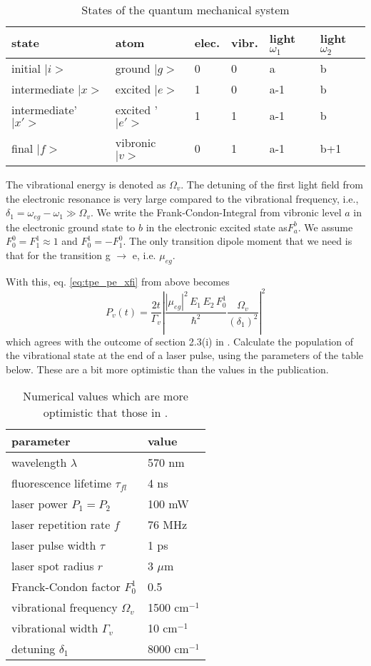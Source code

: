 \begin{table}

\begin{tabular}{l|lll|ll}
state & atom & elec. & vibr. & light $\omega_1$ & light
$\omega_2$ \\ \hline%
initial $|i>$ & ground  $|g>$ & 0  & 0 & a  & b  \\%
intermediate $|x>$ & excited  $|e>$& 1 & 0  & a-1 & b \\%
intermediate' $|x'>$ & excited '  $|e'>$& 1 & 1& a-1  & b \\ %
final $|f>$ & vibronic  $|v>$ & 0 &1& a-1 &b+1
\end{tabular}
\caption{States of the quantum mechanical system}
\end{table}

The vibrational energy is denoted as $ \Omega_v$. The detuning of the first light field from the electronic resonance is very large compared to the vibrational frequency, i.e.,  $\delta_1 = \omega_{eg} - \omega_1  \gg
\Omega_v$. We write the Frank-Condon-Integral
from vibronic level $a$ in the electronic ground state to $b$ in the
electronic excited state as$F_a^b$. We assume  $F_0^0 = F_1^1 \approx 1$ and $F_0^1 = - F_1^0$. The only transition dipole moment that we need is that for the transition g $\rightarrow$ e, i.e.
 $\mu_{eg}$.

With this, eq. \ref{eq:tpe_pe_xfi} from above becomes 
\begin{equation}
P_v(t)    =   \frac{2 t}{ \Gamma_v}
 \left|
 \frac{ |\mu_{eg}|^2 \, E_1 \, E_2  \, F_0^1}{\hbar^2}%
 \frac{\Omega_v}{(\delta_1)^2 } \right|^2
 \label{eq:tpe_vib_ex_final}
\end{equation}
which agrees with the outcome of section 2.3(i) in \cite{Winterhalder11}. Calculate the population  of the vibrational state at the end of a laser pulse, using the parameters of the table below. These are  a bit more optimistic than the values in the publication.


\begin{table}
\begin{tabular}{ll}
parameter & value \\ \hline
wavelength $\lambda$ & 570 nm \\
fluorescence lifetime $\tau_{fl}$ & 4 ns \\
laser power $P_1 = P_2$ & 100 mW \\
laser repetition rate $f$ & 76 MHz \\
laser pulse width $\tau$ & 1 ps \\
laser spot radius $r$ & 3 $\mu$m \\
Franck-Condon factor $F_0^1$ & 0.5 \\
vibrational frequency $\Omega_v$ & 1500 cm$^{-1}$ \\
vibrational width $\Gamma_v$ & 10 cm$^{-1}$ \\
detuning $\delta_1$ & 8000 cm$^{-1}$
\end{tabular}
\caption{Numerical values which are more optimistic that those in \cite{Winterhalder11}.}
\end{table}

\newpage

\printbibliography[segment=\therefsegment,heading=subbibliography]
